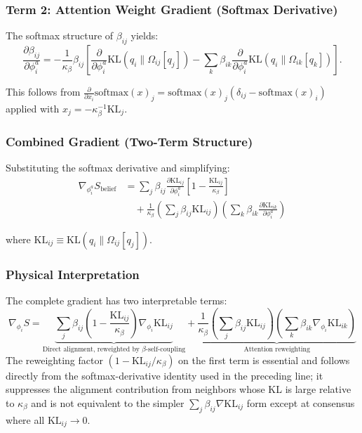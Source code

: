 \documentclass[11pt]{article}
\begin{document}
\subsubsection*{Term 2: Attention Weight Gradient (Softmax Derivative)}

The softmax structure of $\beta_{ij}$ yields:
\begin{equation}
\frac{\partial \beta_{ij}}{\partial \phi_i^a} = -\frac{1}{\kappa_\beta} \beta_{ij} \left[\frac{\partial}{\partial \phi_i^a}\mathrm{KL}(q_i \| \Omega_{ij}[q_j]) - \sum_k \beta_{ik} \frac{\partial}{\partial \phi_i^a}\mathrm{KL}(q_i \| \Omega_{ik}[q_k])\right].
\end{equation}

This follows from $\frac{\partial}{\partial x_i}\mathrm{softmax}(x)_j = \mathrm{softmax}(x)_j(\delta_{ij} - \mathrm{softmax}(x)_i)$ applied with $x_j = -\kappa_\beta^{-1}\mathrm{KL}_j$.

\subsubsection*{Combined Gradient (Two-Term Structure)}

Substituting the softmax derivative and simplifying:
\begin{align}
\nabla_{\phi_i^a} S_{\mathrm{belief}} &= \sum_j \beta_{ij}\frac{\partial \mathrm{KL}_{ij}}{\partial \phi_i^a}\left[1 - \frac{\mathrm{KL}_{ij}}{\kappa_\beta}\right] \nonumber \\
&\quad + \frac{1}{\kappa_\beta}\left(\sum_j \beta_{ij}\mathrm{KL}_{ij}\right)\left(\sum_k \beta_{ik}\frac{\partial \mathrm{KL}_{ik}}{\partial \phi_i^a}\right)
\end{align}

where $\mathrm{KL}_{ij} \equiv \mathrm{KL}(q_i \| \Omega_{ij}[q_j])$.

\subsubsection*{Physical Interpretation}

The complete gradient has two interpretable terms:
\begin{equation}
\boxed{\nabla_{\phi_i} S = \underbrace{\sum_j \beta_{ij}\left(1 - \frac{\mathrm{KL}_{ij}}{\kappa_\beta}\right)\nabla_{\phi_i}\mathrm{KL}_{ij}}_{\text{Direct alignment, reweighted by }\beta\text{-self-coupling}} + \underbrace{\frac{1}{\kappa_\beta}\left(\sum_j \beta_{ij}\mathrm{KL}_{ij}\right) \left(\sum_k \beta_{ik}\nabla_{\phi_i}\mathrm{KL}_{ik}\right)}_{\text{Attention reweighting}}}
\end{equation}
The reweighting factor $(1 - \mathrm{KL}_{ij}/\kappa_\beta)$ on the first term is essential and follows directly from the softmax-derivative identity used in the preceding line; it suppresses the alignment contribution from neighbors whose KL is large relative to $\kappa_\beta$ and is not equivalent to the simpler $\sum_j \beta_{ij}\nabla\mathrm{KL}_{ij}$ form except at consensus where all $\mathrm{KL}_{ij} \to 0$.
\end{document}
